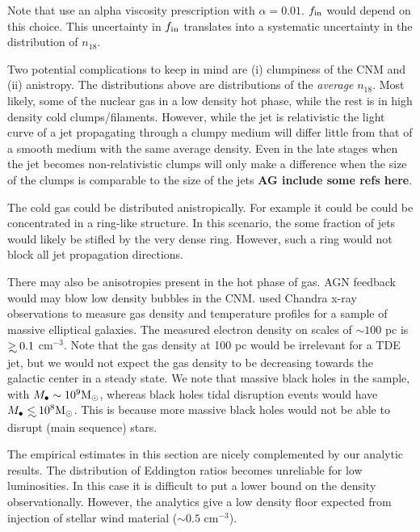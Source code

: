 \documentclass[usenatbib,fleqn]{mnras}
\newcommand\lsim{\mathrel{\rlap{\lower4pt\hbox{\hskip1pt$\sim$}}
    \raise1pt\hbox{$<$}}}
\newcommand\gsim{\mathrel{\rlap{\lower4pt\hbox{\hskip1pt$\sim$}}
    \raise1pt\hbox{$>$}}}
\newcommand{\Mbh}[1][]{M_{\bullet#1}}
\newcommand{\Msun}{{\rm M_\odot}}
\begin{document}
Note that \citet{Li+2013} use an alpha viscosity prescription with
$\alpha=0.01$.  $f_{\rm in}$ would depend on this choice. This
uncertainty in $f_{\rm in}$ translates into a systematic uncertainty
in the distribution of $n_{18}$. 

Two potential complications to keep in mind are (i) clumpiness of the
CNM and (ii) anistropy. The distributions above are distributions of
the {\it average} $n_{18}$.  Most likely, some of the nuclear gas in a
low density hot phase, while the rest is in high density cold
clumps/filaments.  However, while the jet is relativistic the
light curve of a jet propagating through a clumpy medium will differ
little from that of a smooth medium with the same average
density. Even in the late stages when the jet becomes non-relativistic
clumps will only make a difference when the size of the clumps is
comparable to the size of the jets {\bf AG include some refs here}.

The cold gas could be distributed anistropically. For example it could
be could be concentrated in a ring-like structure. In this scenario,
the some fraction of jets would likely be stifled by the very dense
ring. However, such a ring would not block all jet propagation
directions. 

There may also be anisotropies present in the hot phase of gas. AGN
feedback would may blow low density bubbles in the
CNM. \citet{Russell+2013} used Chandra x-ray observations to measure
gas density and temperature profiles for a sample of massive
elliptical galaxies. The measured electron density on scales of $\sim
100$ pc is $\gsim 0.1$ cm$^{-3}$. Note that the gas density at 100 pc
would be irrelevant for a TDE jet, but we would not expect the gas
density to be decreasing towards the galactic center in a steady
state.  We note that massive black holes in the \citet{Russell+2013}
sample, with $\Mbh\sim 10^{9} \Msun$, whereas black holes tidal
disruption events would have $\Mbh\lsim 10^8 \Msun$. This is because
more massive black holes would not be able to disrupt (main sequence)
stars.


The empirical estimates in this section are nicely complemented by our
analytic results. The distribution of Eddington ratios becomes
unreliable for low luminosities.  In this case it is difficult to put
a lower bound on the density observationally. However, the analytics
give a low density floor expected from injection of stellar wind
material ($\sim 0.5$ cm$^{-3}$).

\end{document}
